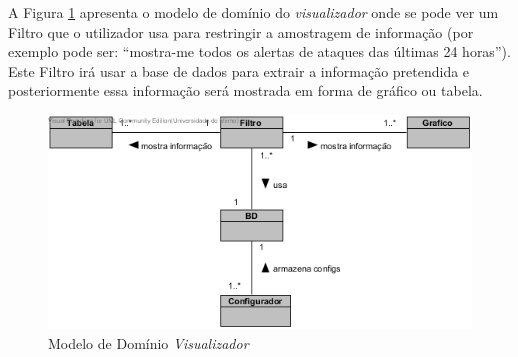 A Figura \ref{fig:mdvis} apresenta o modelo de domínio do \emph{visualizador} onde se pode ver um Filtro que o utilizador usa para restringir a amostragem de
informação (por exemplo pode ser: ``mostra-me todos os alertas de ataques das últimas 24 horas''). Este Filtro irá usar a base de dados para extrair a informação
pretendida e posteriormente essa informação será mostrada em forma de gráfico ou tabela.

\begin{figure}[!ht]
\centering	
\includegraphics[scale=0.8]{images/ModelosDeDominio/Visualizador.png}
\caption{Modelo de Domínio \emph{Visualizador}}
\label{fig:mdvis}
\end{figure}
\pagebreak
